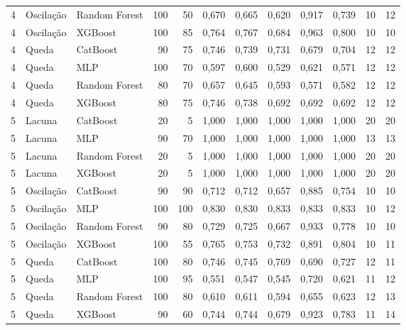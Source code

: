 \begin{longtable}{@{}rllrrrrrrrrr@{}}
4 & Oscilação & Random Forest & 100 & 50 & 0,670 & 0,665 & 0,620 & 0,917 & 0,739 & 10 & 12 \\
4 & Oscilação & XGBoost & 100 & 85 & 0,764 & 0,767 & 0,684 & 0,963 & 0,800 & 10 & 10 \\
4 & Queda & CatBoost & 90 & 75 & 0,746 & 0,739 & 0,731 & 0,679 & 0,704 & 12 & 12 \\
4 & Queda & MLP & 100 & 70 & 0,597 & 0,600 & 0,529 & 0,621 & 0,571 & 12 & 12 \\
4 & Queda & Random Forest & 80 & 70 & 0,657 & 0,645 & 0,593 & 0,571 & 0,582 & 12 & 12 \\
4 & Queda & XGBoost & 80 & 75 & 0,746 & 0,738 & 0,692 & 0,692 & 0,692 & 12 & 12 \\
5 & Lacuna & CatBoost & 20 & 5 & 1,000 & 1,000 & 1,000 & 1,000 & 1,000 & 20 & 20 \\
5 & Lacuna & MLP & 90 & 70 & 1,000 & 1,000 & 1,000 & 1,000 & 1,000 & 13 & 13 \\
5 & Lacuna & Random Forest & 20 & 5 & 1,000 & 1,000 & 1,000 & 1,000 & 1,000 & 20 & 20 \\
5 & Lacuna & XGBoost & 20 & 5 & 1,000 & 1,000 & 1,000 & 1,000 & 1,000 & 20 & 20 \\
5 & Oscilação & CatBoost & 90 & 90 & 0,712 & 0,712 & 0,657 & 0,885 & 0,754 & 10 & 10 \\
5 & Oscilação & MLP & 100 & 100 & 0,830 & 0,830 & 0,833 & 0,833 & 0,833 & 10 & 12 \\
5 & Oscilação & Random Forest & 90 & 80 & 0,729 & 0,725 & 0,667 & 0,933 & 0,778 & 10 & 10 \\
5 & Oscilação & XGBoost & 100 & 55 & 0,765 & 0,753 & 0,732 & 0,891 & 0,804 & 10 & 11 \\
5 & Queda & CatBoost & 100 & 80 & 0,746 & 0,745 & 0,769 & 0,690 & 0,727 & 12 & 11 \\
5 & Queda & MLP & 100 & 95 & 0,551 & 0,547 & 0,545 & 0,720 & 0,621 & 11 & 12 \\
5 & Queda & Random Forest & 100 & 80 & 0,610 & 0,611 & 0,594 & 0,655 & 0,623 & 12 & 13 \\
5 & Queda & XGBoost & 90 & 60 & 0,744 & 0,744 & 0,679 & 0,923 & 0,783 & 11 & 14 \\
\end{longtable}
